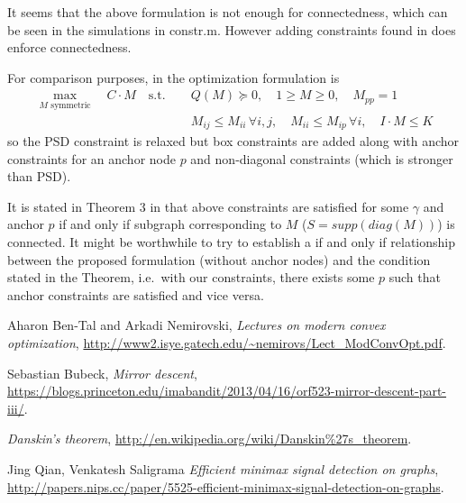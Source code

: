 \documentclass{article}
\begin{document}
It seems that the above formulation is not enough for connectedness, which can be seen in the simulations in constr.m. However adding constraints found in \cite{nips} does enforce connectedness.

For comparison purposes, in \cite{nips} the optimization formulation is
\begin{align*}
  \max_{M \text{ symmetric}} \quad C \cdot M \quad \mathrm{s.t.\ } \quad & Q(M) \succeq 0, \quad 1 \geq M \geq 0, \quad M_{pp} = 1 \\
  & M_{ij} \leq M_{ii} \, \forall i, j, \quad M_{ii} \leq M_{ip} \, \forall i, \quad I \cdot M \leq K
\end{align*}
so the PSD constraint is relaxed but box constraints are added along with anchor constraints for an anchor node $p$ and non-diagonal constraints (which is stronger than PSD).

It is stated in Theorem 3 in \cite{nips} that above constraints are satisfied for some $\gamma$ and anchor $p$ if and only if subgraph corresponding to $M$ ($S = supp(diag(M))$) is connected. It might be worthwhile to try to establish a if and only if relationship between the proposed formulation (without anchor nodes) and the condition stated in the Theorem, i.e.\ with our constraints, there exists some $p$ such that anchor constraints are satisfied and vice versa.




\begin{thebibliography}{9}

  Aharon Ben-Tal and Arkadi Nemirovski,
  \emph{Lectures on modern convex optimization},
  \url{http://www2.isye.gatech.edu/~nemirovs/Lect_ModConvOpt.pdf}.

  Sebastian Bubeck,
  \emph{Mirror descent},
  \url{https://blogs.princeton.edu/imabandit/2013/04/16/orf523-mirror-descent-part-iii/}.

  \emph{Danskin's theorem},
  \url{http://en.wikipedia.org/wiki/Danskin\%27s_theorem}.

  Jing Qian, Venkatesh Saligrama
  \emph{Efficient minimax signal detection on graphs},
  \url{http://papers.nips.cc/paper/5525-efficient-minimax-signal-detection-on-graphs}.

\end{thebibliography}
\end{document}
